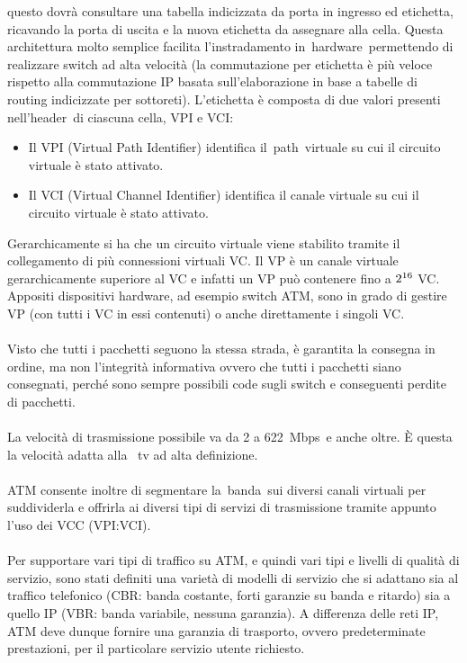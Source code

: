 \documentclass[8pt]{extarticle}
\begin{document}
questo dovrà consultare una tabella indicizzata da porta in ingresso ed etichetta, ricavando la porta di 
uscita e la nuova etichetta da assegnare alla cella. Questa architettura molto semplice facilita 
l'instradamento in hardware permettendo di realizzare switch ad alta velocità (la commutazione 
per etichetta è più veloce rispetto alla commutazione IP basata sull'elaborazione in base a tabelle di 
routing indicizzate per sottoreti).
L'etichetta è composta di due valori presenti nell'header di ciascuna cella, VPI e VCI:\\
\begin{itemize}
    \item Il VPI (Virtual Path Identifier) identifica il path virtuale su cui il circuito virtuale è stato attivato.
    \item Il VCI (Virtual Channel Identifier) identifica il canale virtuale su cui il circuito virtuale è stato attivato.
\end{itemize}
\noindent
Gerarchicamente si ha che un circuito virtuale viene stabilito tramite il collegamento di più connessioni 
virtuali VC. Il VP è un canale virtuale gerarchicamente superiore al VC e infatti un VP può contenere 
fino a $2\textsuperscript{16}$ VC. Appositi dispositivi hardware, ad esempio switch ATM, sono in grado di gestire VP 
(con tutti i VC in essi contenuti) o anche direttamente i singoli VC.\\\\
Visto che tutti i pacchetti seguono la stessa strada, è garantita la consegna in ordine, ma non l'integrità 
informativa ovvero che tutti i pacchetti siano consegnati, perché sono sempre possibili code sugli switch 
e conseguenti perdite di pacchetti.\\\\
La velocità di trasmissione possibile va da 2 a 622 Mbps e anche oltre. È questa la velocità adatta alla 
tv ad alta definizione.\\\\
ATM consente inoltre di segmentare la banda sui diversi canali virtuali per suddividerla e offrirla ai 
diversi tipi di servizi di trasmissione tramite appunto l'uso dei VCC (VPI:VCI).\\\\
Per supportare vari tipi di traffico su ATM, e quindi vari tipi e livelli di qualità di servizio, 
sono stati definiti una varietà di modelli di servizio che si adattano sia al traffico telefonico 
(CBR: banda costante, forti garanzie su banda e ritardo) sia a quello IP (VBR: banda variabile, nessuna 
garanzia). A differenza delle reti IP, ATM deve dunque fornire una garanzia di trasporto, ovvero 
predeterminate prestazioni, per il particolare servizio utente richiesto.
\end{document}
